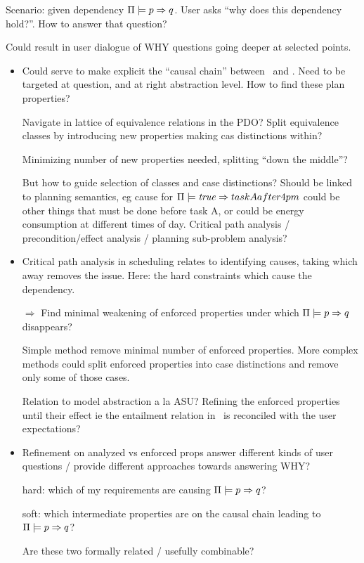 Scenario: given dependency $\Pi \models p \Rightarrow q$. User
asks ``why does this dependency hold?''. How to answer that question?

Could result in user dialogue of WHY questions going deeper at
selected points.

\begin{itemize}
\item {}

  Could serve to make explicit the ``causal chain'' between \prop\ and
  \propq. Need to be targeted at question, and at right abstraction
  level. How to find these plan properties?

  Navigate in lattice of equivalence relations in the PDO? Split
  equivalence classes by introducing new properties making cas
  distinctions within?

  Minimizing number of new properties needed, splitting ``down the
  middle''?

  But how to guide selection of classes and case distinctions? Should
  be linked to planning semantics, eg cause for
  $\Pi \models \mathit{true} \Rightarrow taskAafter4pm$ could be other things that
  must be done before task A, or could be energy consumption at
  different times of day. Critical path analysis / precondition/effect
  analysis / planning sub-problem analysis?

\item {}

  Critical path analysis in scheduling relates to identifying causes,
  taking which away removes the issue. Here: the hard constraints
  which cause the dependency.

  $\Rightarrow$ Find minimal weakening of enforced properties under
  which $\Pi \models p \Rightarrow q$ disappears?

  Simple method remove minimal number of enforced properties. More
  complex methods could split enforced properties into case
  distinctions and remove only some of those cases.

  Relation to model abstraction a la ASU? Refining the enforced
  properties until their effect ie the entailment relation in
  \plans\ is reconciled with the user expectations?

\item Refinement on analyzed vs enforced props answer different kinds
  of user questions / provide different approaches towards answering
  WHY?

  hard: which of my requirements are causing
  $\Pi \models p \Rightarrow q$?

  soft: which intermediate properties are on the causal chain leading
  to $\Pi \models p \Rightarrow q$?

  Are these two formally related / usefully combinable?

\end{itemize}







